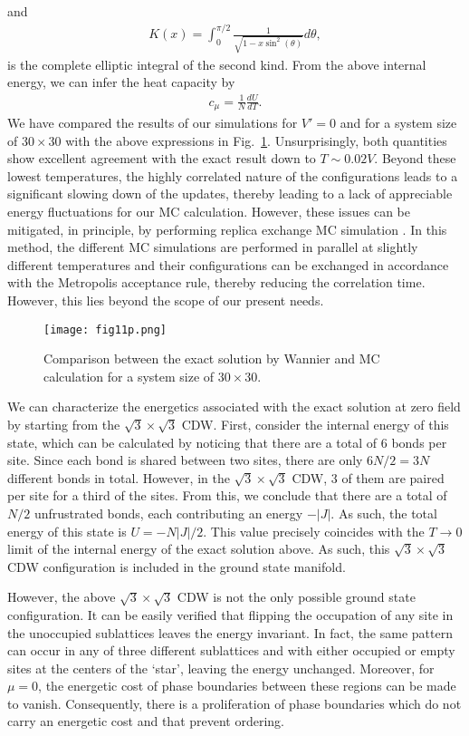 \documentclass[aps,prx,onecolumn,amsmath,nofootinbib,amssymb,11pt]{revtex4-1}
\def \beq {\begin{eqnarray}}
\def \eeq {\end{eqnarray}}
\begin{document}
{\begin{appendix}
and 
\beq
K\left(x\right)=\int_{0}^{\pi/2} \frac{1}{\sqrt{1-x \sin^2 (\theta)}} d\theta,  
\eeq
is the complete elliptic integral of the second kind. From the above internal energy, we can infer the heat capacity by 
\beq
c_{\mu}=\frac{1}{N}\frac{dU}{dT}.
\eeq
We have compared the results of our simulations for $V'=0$ and for a system size of $30\times30$ with the above expressions in Fig.~\ref{fig:exactsol}. Unsurprisingly, both quantities show excellent agreement with the exact result down to $T\sim0.02V$. Beyond these lowest temperatures, the highly correlated nature of the configurations leads to a significant slowing down of the updates, thereby leading to a lack of appreciable energy fluctuations for our MC calculation. However, these issues can be mitigated, in principle, by performing replica exchange MC simulation \cite{ReplicaExc}. In this method, the different MC simulations are performed in parallel at slightly different temperatures and their configurations can be exchanged in accordance with the Metropolis acceptance rule, thereby reducing the correlation time. However, this lies beyond the scope of our present needs. 

\begin{figure}
\centering
\texttt{[image: fig11p.png]}
\caption{\textsf{Comparison between the exact solution by Wannier and MC calculation for a system size of $30\times30$.}}
\label{fig:exactsol} 
\end{figure} 


We can characterize the energetics associated with the exact solution at zero field by starting from the $\sqrt{3}\times\sqrt{3}$ CDW. First, consider the internal energy of this state, which
can be calculated by noticing that there are a total of $6$ bonds per
site. Since each bond is shared between two sites, there are
only $6N/2=3N$ different bonds in total. However, in the $\sqrt{3}\times\sqrt{3}$
CDW, $3$ of them are paired per site for a third of the sites. From
this, we conclude that there are a total of $N/2$ unfrustrated bonds,
each contributing an energy $-\left|J\right|$. As such, the total
energy of this state is $U=-N\left|J\right|/2$. This value precisely
coincides with the $T\rightarrow0$ limit of the internal energy of
the exact solution above. As such, this $\sqrt{3}\times\sqrt{3}$
CDW configuration is included in the ground state manifold. 

However, the above $\sqrt{3}\times\sqrt{3}$ CDW is not the only possible
ground state configuration. It can be easily verified that flipping the occupation
of any site in the unoccupied sublattices leaves the energy invariant.
In fact, the same pattern can occur in any of three different sublattices
and with either occupied or empty sites at the centers of the `star',
leaving the energy unchanged. Moreover, for $\mu=0$, the energetic
cost of phase boundaries between these regions can be made to vanish.
Consequently, there is a proliferation of phase boundaries which do
not carry an energetic cost and that prevent ordering.


\end{appendix}}
\end{document}
